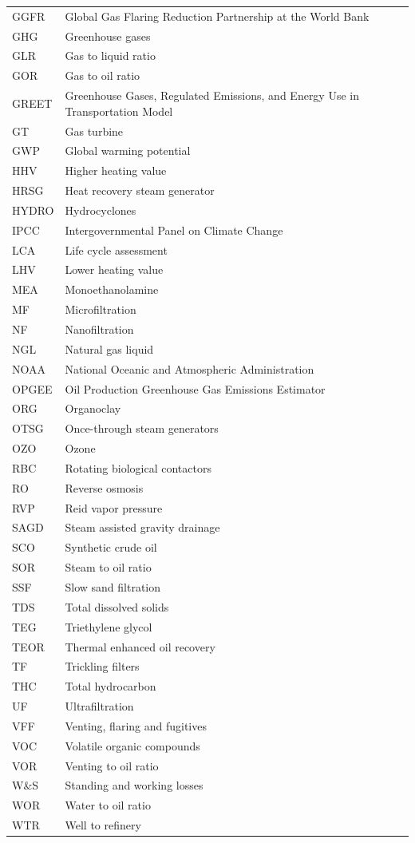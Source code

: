 \documentclass[11pt]{report}
\begin{document}
{{{{\begin{scriptsize}
\begin{supertabular*}{1\columnwidth}{p{0.15\columnwidth}p{0.8\columnwidth}}
GGFR & Global Gas Flaring Reduction Partnership at the World Bank\\
GHG & Greenhouse gases\\
GLR & Gas to liquid ratio\\
GOR & Gas to oil ratio\\
GREET & Greenhouse Gases, Regulated Emissions, and Energy Use in Transportation Model\\
GT & Gas turbine\\
GWP & Global warming potential\\
HHV & Higher heating value\\
HRSG & Heat recovery steam generator\\
HYDRO & Hydrocyclones\\
IPCC & Intergovernmental Panel on Climate Change\\
LCA & Life cycle assessment\\
LHV & Lower heating value\\
MEA & Monoethanolamine\\
MF & Microfiltration\\
NF & Nanofiltration\\
NGL & Natural gas liquid\\
NOAA & National Oceanic and Atmospheric Administration\\
OPGEE & Oil Production Greenhouse Gas Emissions Estimator\\
ORG & Organoclay\\
OTSG & Once-through steam generators\\
OZO & Ozone\\
RBC & Rotating biological contactors\\
RO & Reverse osmosis\\
RVP & Reid vapor pressure \\
SAGD & Steam assisted gravity drainage\\
SCO & Synthetic crude oil\\
SOR & Steam to oil ratio\\
SSF & Slow sand filtration\\
TDS & Total dissolved solids\\
TEG & Triethylene glycol\\
TEOR & Thermal enhanced oil recovery\\
TF & Trickling filters\\
THC & Total hydrocarbon\\
UF & Ultrafiltration\\
VFF & Venting, flaring and fugitives\\
VOC & Volatile organic compounds\\
VOR & Venting to oil ratio\\
W\&S & Standing and working losses \\
WOR & Water to oil ratio\\
WTR & Well to refinery\\
\end{supertabular*}
\end{scriptsize}


}}}}
\end{document}
